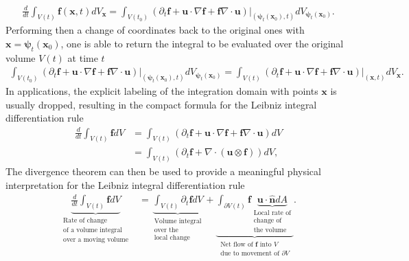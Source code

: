 \begin{align}
    \frac{d}{dt}\int_{V(t)}\bm{f}(\bm{x},t)dV_{\bm{x}}=\int_{V(t_0)}\left(\partial_t\bm{f}+\bm{u}\cdot\nabla\bm{f}+\bm{f}\nabla\cdot\bm{u}\right)\Big|_{(\bm{\psi}_t(\bm{x}_0),t)}dV_{\bm{\psi}_t(\bm{x}_0)}.
\end{align}
Performing then a change of coordinates back to the original ones with $\bm{x}=\bm{\psi}_t(\bm{x}_0)$, one is able to return the integral to be evaluated over the original volume $V(t)$ at time $t$
\begin{align*}
    \int_{V(t_0)}\left(\partial_t\bm{f}+\bm{u}\cdot\nabla\bm{f}+\bm{f}\nabla\cdot\bm{u}\right)\Big|_{(\bm{\psi}_t(\bm{x}_0),t)}dV_{\bm{\psi}_t(\bm{x}_0)}=\int_{V(t)}\left(\partial_t\bm{f}+\bm{u}\cdot\nabla\bm{f}+\bm{f}\nabla\cdot\bm{u}\right)\Big|_{(\bm{x},t)}dV_{\bm{x}}.
\end{align*}
In applications, the explicit labeling of the integration domain with points $\bm{x}$ is usually dropped, resulting in the compact formula for the Leibniz integral differentiation rule
\begin{align}\label{eq:leibniz-rule}
    \frac{d}{dt}\int_{V(t)}\bm{f}dV&=\int_{V(t)}\left(\partial_t\bm{f}+\bm{u}\cdot\nabla\bm{f}+\bm{f}\nabla\cdot\bm{u}\right)dV\nonumber\\
    &=\int_{V(t)}\left(\partial_t\bm{f}+\nabla\cdot(\bm{u}\otimes\bm{f})\right)dV,
\end{align}
The divergence theorem can then be used to provide a meaningful physical interpretation for the Leibniz integral differentiation rule
\begin{align}
    \underbrace{\frac{d}{dt}\int_{V(t)}\bm{f}dV}_{\substack{\text{Rate of change}\\\text{of a volume integral}\\\text{over a moving volume}}}&=\underbrace{\int_{V(t)}\partial_t \bm{f}dV}_{\substack{\text{Volume integral}\\\text{over the}\\\text{local change}}} +\underbrace{\int_{\partial V(t)}\bm{f}\underbrace{\bm{u}\cdot\bm{\hat{n}} dA}_{\substack{\text{Local rate of}\\\text{change of}\\\text{the volume}}}}_{\substack{\text{Net flow of $\bm{f}$ into $V$}\\\text{due to movement of $\partial V$}}}.
\end{align}
